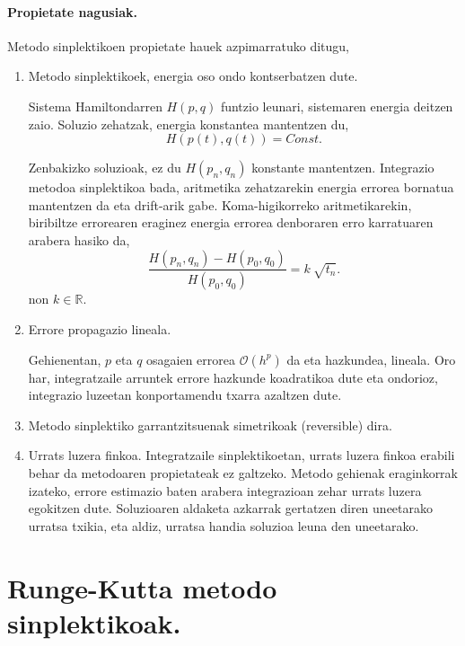 \paragraph*{Propietate nagusiak.}Metodo sinplektikoen propietate hauek azpimarratuko ditugu,
\begin{enumerate}

\item Metodo sinplektikoek, energia oso ondo kontserbatzen dute.

Sistema Hamiltondarren $H(p,q)$ funtzio leunari, sistemaren energia deitzen zaio. Soluzio zehatzak, energia konstantea mantentzen du,
\begin{equation*}
H(p(t),q(t))=Const.
\end{equation*}

Zenbakizko soluzioak, ez du $H(p_n,q_n)$  konstante mantentzen. Integrazio metodoa sinplektikoa bada, aritmetika zehatzarekin energia errorea bornatua mantentzen da eta drift-arik gabe. Koma-higikorreko aritmetikarekin, biribiltze errorearen eraginez energia errorea denboraren erro karratuaren arabera hasiko da,
\begin{equation*}
\frac{H(p_n,q_n)-H(p_0,q_0)}{H(p_0,q_0)}=k \ \sqrt{t_n}.
\end{equation*}
non $k\in \mathbb{R}$.

\item Errore propagazio lineala.

Gehienentan, $p$ eta $q$ osagaien errorea $\mathcal{O}(h^p)$ da eta hazkundea, lineala. Oro har, integratzaile arruntek errore hazkunde koadratikoa dute eta ondorioz, integrazio luzeetan konportamendu txarra azaltzen dute.

\item Metodo sinplektiko garrantzitsuenak simetrikoak (reversible) dira.

\item Urrats luzera finkoa. Integratzaile sinplektikoetan, urrats luzera finkoa erabili behar da metodoaren propietateak ez galtzeko.  Metodo gehienak eraginkorrak izateko, errore estimazio baten arabera integrazioan zehar urrats luzera egokitzen dute. Soluzioaren aldaketa azkarrak gertatzen diren uneetarako urratsa txikia, eta aldiz, urratsa handia soluzioa leuna den uneetarako.   

\end{enumerate} 

\section{Runge-Kutta metodo sinplektikoak.}

